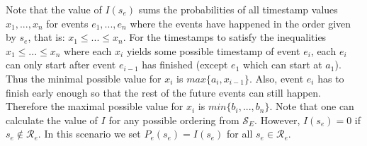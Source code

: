 \begin{itemize}
Note that the value of $I(s_e)$ sums the probabilities of all timestamp values $x_1,...,x_n$ for events $e_1,...,e_n$ where the events have happened in the order given by $s_e$, that is: $x_1 \leq ... \leq x_n$.
For the timestamps to satisfy the inequalities $x_1 \leq  ...  \leq x_n$ where each $x_i$ yields some possible timestamp of event $e_i$, each $e_i$ can only start after event $e_{i-1}$ has finished (except $e_1$ which can start at $a_1$).
Thus the minimal possible value for $x_i$ is $max\{a_i,x_{i-1}\}$.
Also, event $e_i$ has to finish early enough so that the rest of the future events can still happen.
Therefore the maximal possible value for $x_i$ is $min\{b_i,...,b_n\}$.
Note that one can calculate the value of $I$ for any possible ordering from $\mathcal{S}_E$.
However, $I(s_e)=0$ if $s_e \not \in \mathcal{R}_e$.
In this scenario we set $P_e(s_e)= I(s_e)$ for all $s_e \in \mathcal{R}_e$.


\end{itemize}
